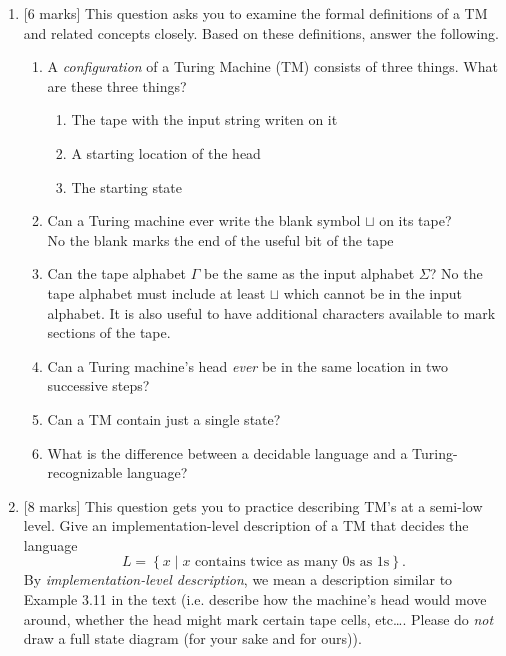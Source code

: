 \documentclass{article}
\newcommand{\set}[1]{{\left\{#1\right\}}}    %
\begin{document}
\begin{enumerate}
    \item {[6 marks]} This question asks you to examine the formal definitions of a TM and related concepts closely. Based on these definitions, answer the following.
        \begin{enumerate}
            \item A \emph{configuration} of a Turing Machine (TM) consists of three things. What are these three things? \\
            \begin{enumerate}
            \item The tape with the input string writen on it
            \item A starting location of the head
            \item The starting state
            \end{enumerate}
            \item Can a Turing machine ever write the blank symbol $\sqcup$ on its tape? \\
            No the blank marks the end of the useful bit of the tape
            \item Can the tape alphabet $\Gamma$ be the same as the input alphabet $\Sigma$? No the tape alphabet must include at least $\sqcup$ which cannot be in the input alphabet. It is also useful to have additional characters available to mark sections of the tape.
            \item Can a Turing machine's head \emph{ever} be in the same location in two successive steps?
            \item Can a TM contain just a single state?
            \item What is the difference between a decidable language and a Turing-recognizable language?
        \end{enumerate}
    \item {[8 marks]} This question gets you to practice describing TM's at a semi-low level. Give an implementation-level description of a TM that decides the language \[L=\set{x\mid x\text{ contains twice as many 0s as 1s}}.\] By \emph{implementation-level description}, we mean a description similar to Example 3.11 in the text (i.e. describe how the machine's head would move around, whether the head might mark certain tape cells, etc\ldots. Please do \emph{not} draw a full state diagram (for your sake and for ours)).


\end{enumerate}
\end{document}
